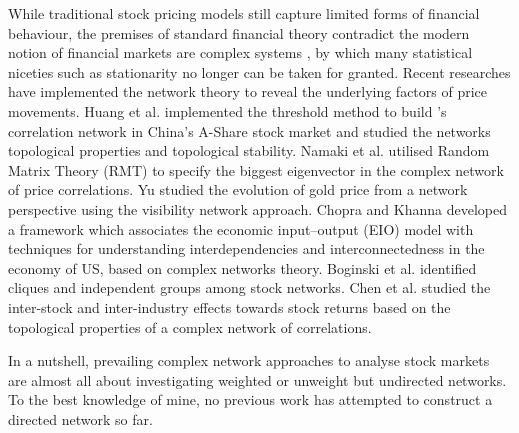While traditional stock pricing models still capture limited forms of financial behaviour, the premises of standard financial theory contradict the modern notion of financial markets are complex systems \cite{financialcomplex}, by which many statistical niceties such as stationarity no longer can be taken for granted. Recent researches have implemented the network theory to reveal the underlying factors of price movements. Huang et al. \cite{chinesenetwork} implemented the threshold method to build ’s correlation network in China's A-Share stock market and studied the networks topological properties and topological stability. Namaki et al. \cite{genuine} utilised Random Matrix Theory (RMT) to specify the biggest eigenvector in the complex network of price correlations. Yu \cite{visibility} studied the evolution of gold price from a network perspective using the visibility network approach. Chopra and Khanna \cite{intercd} developed a framework which associates the economic input–output (EIO) model with techniques for understanding interdependencies and interconnectedness in the economy of US, based on complex networks theory. Boginski et al. \cite{statisticalanalysis} identified cliques and independent groups among stock networks. Chen et al. \cite{profitable} studied the inter-stock and inter-industry effects towards stock returns based on the topological properties of a complex network of correlations.

In a nutshell, prevailing complex network approaches to analyse stock markets are almost all about investigating weighted or unweight but undirected networks. To the best knowledge of mine, no previous work has attempted to construct a directed network so far.
